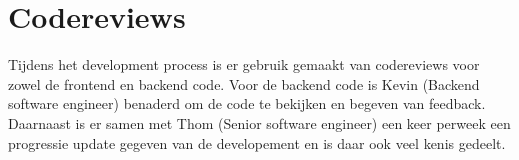 \section{Codereviews}
Tijdens het development process is er gebruik gemaakt van codereviews voor zowel de frontend en backend code.
Voor de backend code is Kevin (Backend software engineer) benaderd om de code te bekijken en begeven van feedback.
Daarnaast is er samen met Thom (Senior software engineer) een keer perweek een progressie update gegeven van de developement en is daar ook veel kenis gedeelt. 

